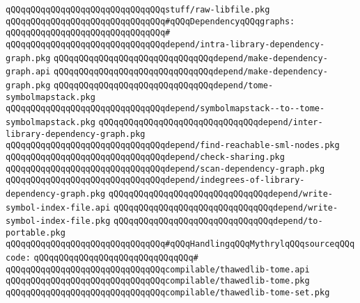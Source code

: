 \verb|qQQqqQQqqQQqqQQqqQQqqQQqqQQqqQQqstuff/raw-libfile.pkg|\newline
\newline
\verb|qQQqqQQqqQQqqQQqqQQqqQQqqQQqqQQq#qQQqDependencyqQQqgraphs:|\newline
\verb|qQQqqQQqqQQqqQQqqQQqqQQqqQQqqQQq#|\newline
\verb|qQQqqQQqqQQqqQQqqQQqqQQqqQQqqQQqdepend/intra-library-dependency-graph.pkg|\newline
\verb|qQQqqQQqqQQqqQQqqQQqqQQqqQQqqQQqdepend/make-dependency-graph.api|\newline
\verb|qQQqqQQqqQQqqQQqqQQqqQQqqQQqqQQqdepend/make-dependency-graph.pkg|\newline
\verb|qQQqqQQqqQQqqQQqqQQqqQQqqQQqqQQqdepend/tome-symbolmapstack.pkg|\newline
\verb|qQQqqQQqqQQqqQQqqQQqqQQqqQQqqQQqdepend/symbolmapstack--to--tome-symbolmapstack.pkg|\newline
\verb|qQQqqQQqqQQqqQQqqQQqqQQqqQQqqQQqdepend/inter-library-dependency-graph.pkg|\newline
\verb|qQQqqQQqqQQqqQQqqQQqqQQqqQQqqQQqdepend/find-reachable-sml-nodes.pkg|\newline
\verb|qQQqqQQqqQQqqQQqqQQqqQQqqQQqqQQqdepend/check-sharing.pkg|\newline
\verb|qQQqqQQqqQQqqQQqqQQqqQQqqQQqqQQqdepend/scan-dependency-graph.pkg|\newline
\verb|qQQqqQQqqQQqqQQqqQQqqQQqqQQqqQQqdepend/indegrees-of-library-dependency-graph.pkg|\newline
\verb|qQQqqQQqqQQqqQQqqQQqqQQqqQQqqQQqdepend/write-symbol-index-file.api|\newline
\verb|qQQqqQQqqQQqqQQqqQQqqQQqqQQqqQQqdepend/write-symbol-index-file.pkg|\newline
\newline
\verb|qQQqqQQqqQQqqQQqqQQqqQQqqQQqqQQqdepend/to-portable.pkg|\newline
\newline
\verb|qQQqqQQqqQQqqQQqqQQqqQQqqQQqqQQq#qQQqHandlingqQQqMythrylqQQqsourceqQQqcode:|\newline
\verb|qQQqqQQqqQQqqQQqqQQqqQQqqQQqqQQq#|\newline
\verb|qQQqqQQqqQQqqQQqqQQqqQQqqQQqqQQqcompilable/thawedlib-tome.api|\newline
\verb|qQQqqQQqqQQqqQQqqQQqqQQqqQQqqQQqcompilable/thawedlib-tome.pkg|\newline
\verb|qQQqqQQqqQQqqQQqqQQqqQQqqQQqqQQqcompilable/thawedlib-tome-set.pkg|\newline
